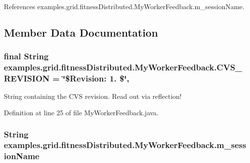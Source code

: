 References examples.\-grid.\-fitness\-Distributed.\-My\-Worker\-Feedback.\-m\-\_\-session\-Name.



\subsection{Member Data Documentation}
\hypertarget{classexamples_1_1grid_1_1fitness_distributed_1_1_my_worker_feedback_ae8633ab42f09c8a8e6548074ed4767d0}{
\subsubsection[{C\-V\-S\-\_\-\-R\-E\-V\-I\-S\-I\-O\-N}]{\setlength{\rightskip}{0pt plus 5cm}final String examples.\-grid.\-fitness\-Distributed.\-My\-Worker\-Feedback.\-C\-V\-S\-\_\-\-R\-E\-V\-I\-S\-I\-O\-N = \char`\"{}\$Revision\-: 1. \$\char`\"{}\hspace{0.3cm}{\ttfamily [static]}, {\ttfamily [private]}}}\label{classexamples_1_1grid_1_1fitness_distributed_1_1_my_worker_feedback_ae8633ab42f09c8a8e6548074ed4767d0}
String containing the C\-V\-S revision. Read out via reflection! 

Definition at line 25 of file My\-Worker\-Feedback.\-java.

\hypertarget{classexamples_1_1grid_1_1fitness_distributed_1_1_my_worker_feedback_a7b59f71dd754389f3476578d9b6a685a}{
\subsubsection[{m\-\_\-session\-Name}]{\setlength{\rightskip}{0pt plus 5cm}String examples.\-grid.\-fitness\-Distributed.\-My\-Worker\-Feedback.\-m\-\_\-session\-Name\hspace{0.3cm}{\ttfamily [private]}}}\label{classexamples_1_1grid_1_1fitness_distributed_1_1_my_worker_feedback_a7b59f71dd754389f3476578d9b6a685a}


